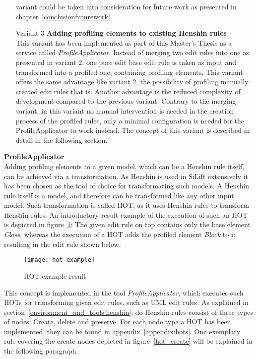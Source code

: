 \begin{enumerate}
  variant could be taken into consideration for future work as presented in
  chapter~\ref{conclusionfuturework}.
  \item[Variant 3] \textbf{Adding profiling elements to existing Henshin rules}\\
  This variant has been implemented as part of this Master's Thesis as a service
  called \textit{ProfileApplicator}. Instead of merging two edit rules into one 
  as presented in variant 2, one pure edit base edit rule is taken as input and 
  transformed into a profiled one, containing profiling elements. This variant
  offers the same advantage like variant 2, the possibility of profiling
  manually created edit rules that is. Another advantage is the reduced complexity of
  development compared to the previous variant. Contrary to the merging variant,
  in this variant no manual intervention is needed in the creation process of
  the profiled rules, only a minimal configuration is needed for the
  ProfileApplicator to work instead. The concept of this variant is described in
  detail in the following section.
\end{enumerate}
\textbf{ProfileApplicator}\\
Adding profiling elements to a given model, which can be a Henshin rule itself,
can be achieved via a transformation. As Henshin is used in SiLift extensively
it has been chosen as the tool of choice for transformating such models. A Henshin
rule itself is a model, and therefore can be transformed like any other input
model. Such transformation is called \ac{HOT}, as it uses Henshin rules to
transform Henshin rules. An introductory result example of the execution of such
an \ac{HOT} is depicted in figure~\ref{hot_example}: The given edit rule on top
contains only the base element \textit{Class}, whereas the execution of a
\ac{HOT} adds the profiled element \textit{Block} to it resulting in the edit
rule shown below. 

\begin{figure}[h!]
\begin{center}
\texttt{[image: hot\_example]}\\
\end{center}
\caption{\ac{HOT} example result}
\label{hot_example}
\end{figure}

This concept is implemented in the tool \textit{ProfileApplicator},
which executes such \ac{HOT}s for transforming given edit rules, such as
\ac{UML} edit rules.
As explained in section~\ref{environment_and_tools:henshin}, do Henshin rules
consist of three types of nodes: Create, delete and preserve. For each node type
a \ac{HOT} has been implemented, they can be found in
appendix~\ref{appendix:hots}. One exemplary rule covering the create nodes
depicted in figure~\ref{hot_create} will be explained in the following
paragraph.

